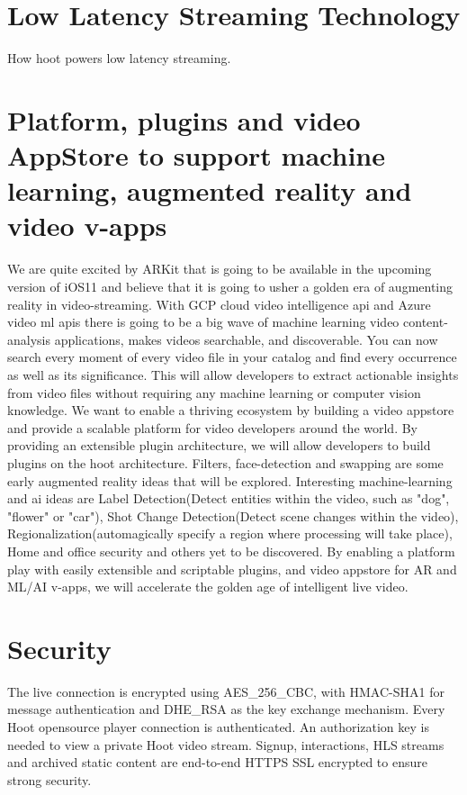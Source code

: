 \documentclass{article}
\begin{document}
\section{Low Latency Streaming Technology}
How hoot powers low latency streaming.



\section{Platform, plugins and video AppStore to support machine learning,
  augmented reality and video v-apps}
We are quite excited by ARKit that is going to be available in the
upcoming version of iOS11 and believe that it is going to usher a
golden era of augmenting reality in video-streaming. With GCP cloud
video intelligence api and Azure video ml apis there is going to be a
big wave of machine learning video content-analysis applications,
makes videos searchable, and discoverable. You can now search every
moment of every video file in your catalog and find every occurrence
as well as its significance. This will allow developers to extract actionable insights from video files without requiring any machine learning or computer vision knowledge.  We want to enable a
thriving ecosystem by building a video appstore and provide a scalable
platform for video developers around the world. By providing an
extensible plugin architecture, we will allow developers to build
plugins on the hoot architecture. Filters, face-detection and swapping
are some early augmented reality ideas that will be explored. Interesting
machine-learning and ai ideas are Label Detection(Detect entities
within the video, such as "dog", "flower" or "car"), Shot Change
Detection(Detect scene changes within the video),
Regionalization(automagically specify a region where processing will
take place), Home and office security and others yet to be discovered. By enabling a platform
play with easily extensible and scriptable plugins, and video appstore
for AR and ML/AI v-apps, we will accelerate the golden age of
intelligent live video.

\section{Security}
The live connection is encrypted using AES\_256\_CBC, with HMAC-SHA1 for message authentication and DHE\_RSA as the key exchange mechanism. Every Hoot opensource player connection is authenticated.
An authorization key is needed to view a private Hoot video stream. Signup, interactions, HLS streams and archived static content are end-to-end HTTPS  SSL encrypted to ensure strong security.    
\end{document}
